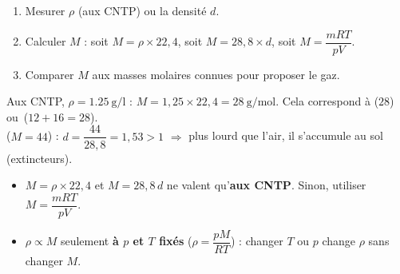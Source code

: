 \documentclass[11pt,a4paper]{article}
\begin{document}
\begin{methode}
\begin{enumerate}[leftmargin=1.6em,topsep=2pt,itemsep=1pt]
  \item Mesurer $\rho$ (aux CNTP) ou la densité $d$.
  \item Calculer $M$ : soit $M=\rho\times22{,}4$, soit $M=28{,}8\times d$, soit $M=\dfrac{mRT}{pV}$.
  \item Comparer $M$ aux masses molaires connues pour proposer le gaz.
\end{enumerate}
\end{methode}

\begin{exemplebox}
Aux CNTP, $\rho=\qty{1.25}{\gram\per\litre}$ : $M=1{,}25\times22{,}4=\qty{28}{\gram\per\mole}$. Cela
correspond à  ($28$) ou \,($12+16=28$). \\[2pt]
 ($M=44$) : $d=\dfrac{44}{28{,}8}=1{,}53>1$ $\Rightarrow$ plus lourd que l'air, il s'accumule au
sol (extincteurs).
\end{exemplebox}

\begin{piege}
\begin{itemize}[leftmargin=1.4em,topsep=2pt,itemsep=1pt]
  \item $M=\rho\times22{,}4$ et $M=28{,}8\,d$ ne valent qu'\textbf{aux CNTP}. Sinon, utiliser
        $M=\dfrac{mRT}{pV}$.
  \item $\rho\propto M$ seulement \textbf{à $p$ et $T$ fixés} ($\rho=\dfrac{pM}{RT}$) : changer $T$ ou
        $p$ change $\rho$ sans changer $M$.
\end{itemize}
\end{piege}
\end{document}
